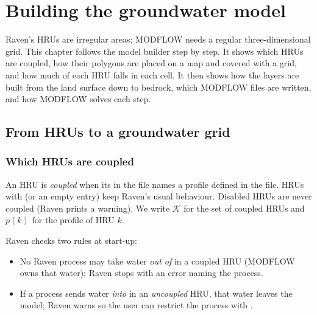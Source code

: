 \chapter{Building the groundwater model}\label{ch:c3}
Raven's HRUs are irregular areas; MODFLOW needs a regular three-dimensional grid. This chapter follows the model builder step by step. It shows which HRUs are coupled, how their polygons are placed on a map
and covered with a grid, and how much of each HRU falls in each cell. It then shows how the layers are built from the land
surface down to bedrock, which MODFLOW files are written, and how MODFLOW solves each step.

\section{From HRUs to a groundwater grid}\label{ch:grid}
\subsection{Which HRUs are coupled}
An HRU is \emph{coupled} when its  in the  file names a profile defined in the
 file. HRUs with \cmd{[NONE]} (or an empty entry) keep Raven's usual behaviour. Disabled HRUs are never
coupled (Raven prints a warning). We write $\mathcal{K}$ for the set of coupled HRUs and $p(k)$ for the profile of HRU $k$.

Raven checks two rules at start-up:
\begin{itemize}
\item No Raven process may take water \emph{out of}  in a coupled HRU (MODFLOW owns that water);
Raven stops with an error naming the process.
\item If a process sends water \emph{into}  in an \emph{uncoupled} HRU, that water leaves the model;
Raven warns so the user can restrict the process with .
\end{itemize}


